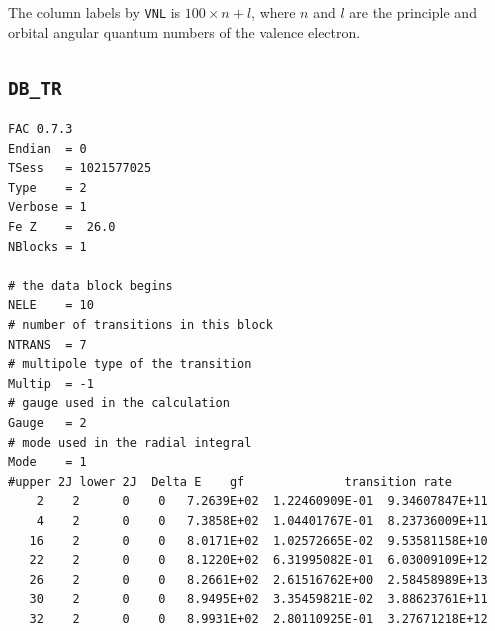 \documentclass[twoside,letterpaper]{refrep}
\begin{document}
The column labels by \verb|VNL| is $100\times n + l$, where $n$ and $l$ 
are the principle and orbital angular quantum numbers of the valence 
electron.

\subsection{\texttt{DB\_TR}}
\begin{verbatim}
FAC 0.7.3
Endian	= 0
TSess	= 1021577025
Type	= 2
Verbose	= 1
Fe Z	=  26.0
NBlocks	= 1

# the data block begins
NELE	= 10
# number of transitions in this block
NTRANS	= 7
# multipole type of the transition
Multip	= -1
# gauge used in the calculation
Gauge	= 2
# mode used in the radial integral
Mode	= 1
#upper 2J lower 2J  Delta E    gf              transition rate
    2	 2	    0	 0	 7.2639E+02  1.22460909E-01  9.34607847E+11
    4	 2	    0	 0	 7.3858E+02  1.04401767E-01  8.23736009E+11
   16	 2	    0	 0	 8.0171E+02  1.02572665E-02  9.53581158E+10
   22	 2	    0	 0	 8.1220E+02  6.31995082E-01  6.03009109E+12
   26	 2	    0	 0	 8.2661E+02  2.61516762E+00  2.58458989E+13
   30	 2	    0	 0	 8.9495E+02  3.35459821E-02  3.88623761E+11
   32	 2	    0	 0	 8.9931E+02  2.80110925E-01  3.27671218E+12
\end{verbatim}
\end{document}
